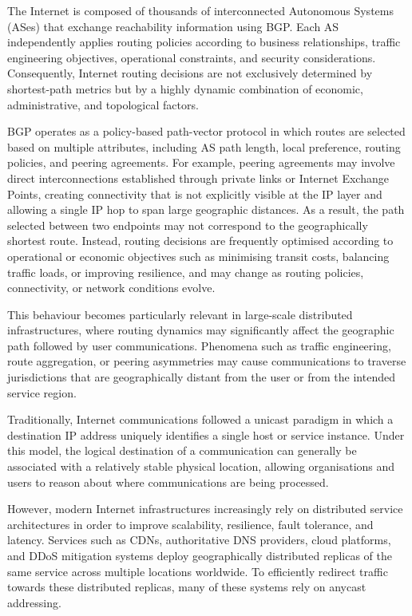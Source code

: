 \documentclass[
A4paper,                %
twoside,                %
openright,              %
chapterprefix=true,     %
12pt,                   %
headings=normal,        %
titlepage=on            %
]{book}
\begin{document}
The Internet is composed of thousands of interconnected Autonomous Systems (ASes) that exchange reachability information using BGP. Each AS independently applies routing policies according to business relationships, traffic engineering objectives, operational constraints, and security considerations. Consequently, Internet routing decisions are not exclusively determined by shortest-path metrics but by a highly dynamic combination of economic, administrative, and topological factors.

BGP operates as a policy-based path-vector protocol in which routes are selected based on multiple attributes, including AS path length, local preference, routing policies, and peering agreements. For example, peering agreements may involve direct interconnections established through private links or Internet Exchange Points, creating connectivity that is not explicitly visible at the IP layer and allowing a single IP hop to span large geographic distances. As a result, the path selected between two endpoints may not correspond to the geographically shortest route. Instead, routing decisions are frequently optimised according to operational or economic objectives such as minimising transit costs, balancing traffic loads, or improving resilience, and may change as routing policies, connectivity, or network conditions evolve.

This behaviour becomes particularly relevant in large-scale distributed infrastructures, where routing dynamics may significantly affect the geographic path followed by user communications. Phenomena such as traffic engineering, route aggregation, or peering asymmetries may cause communications to traverse jurisdictions that are geographically distant from the user or from the intended service region.

Traditionally, Internet communications followed a unicast paradigm in which a destination IP address uniquely identifies a single host or service instance. Under this model, the logical destination of a communication can generally be associated with a relatively stable physical location, allowing organisations and users to reason about where communications are being processed.

However, modern Internet infrastructures increasingly rely on distributed service architectures in order to improve scalability, resilience, fault tolerance, and latency. Services such as CDNs, authoritative DNS providers, cloud platforms, and DDoS mitigation systems deploy geographically distributed replicas of the same service across multiple locations worldwide. To efficiently redirect traffic towards these distributed replicas, many of these systems rely on anycast addressing.
\end{document}
